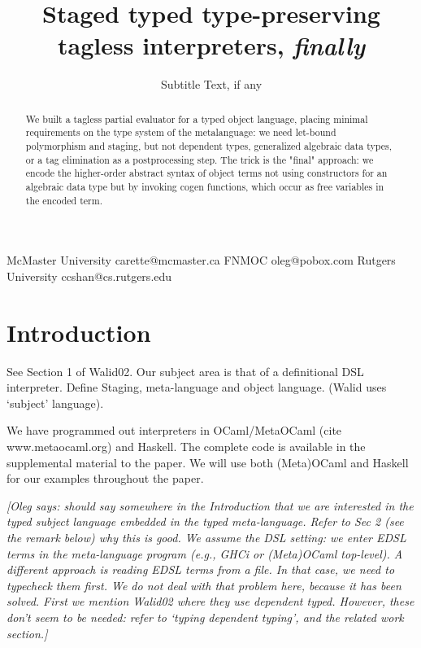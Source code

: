 \documentclass[preprint]{sigplanconf}
\newcommand{\oleg}[1]{{\it [Oleg says: #1]}}
\begin{document}
\copyrightdata{[to be supplied]} 


\title{Staged typed type-preserving tagless interpreters, \emph{finally}}
\subtitle{Subtitle Text, if any}

           {McMaster University}
           {carette@mcmaster.ca}
           {FNMOC}
           {oleg@pobox.com}
           {Rutgers University}
           {ccshan@cs.rutgers.edu}

\maketitle

\begin{abstract}
We built a tagless partial evaluator for a typed object language,
placing minimal requirements on the type system of the metalanguage:
we need let-bound polymorphism and staging, but not dependent
types, generalized algebraic data types, or a tag elimination as a
postprocessing step.
The trick is the "final" approach: we encode the
higher-order abstract syntax of object terms not using constructors for
an algebraic data type but by invoking cogen functions, which occur as
free variables in the encoded term.
\end{abstract}


\section{Introduction}

See Section 1 of Walid02. Our subject area is that of a definitional DSL
interpreter.
Define Staging, meta-language and object language. (Walid uses
`subject' language).

We have programmed out interpreters in OCaml/MetaOCaml (cite
www.metaocaml.org) and Haskell. The complete code is available 
in the supplemental material to the paper. We will use both
(Meta)OCaml and Haskell for our examples throughout the paper.

\oleg{should say somewhere in the Introduction that we are interested
  in the typed subject language embedded in the typed
  meta-language. Refer to Sec 2 (see the remark below) why this is
  good. We assume the DSL setting: we enter EDSL terms in the
  meta-language program (e.g., GHCi or (Meta)OCaml top-level). A
  different approach is reading EDSL terms from a file. In that case, we
  need to typecheck them first. We do not deal with that problem here,
  because it has been solved. First we mention Walid02 where they use
  dependent typed. However, these don't seem to be needed: refer to
  `typing dependent typing', and the related work section.}
\end{document}
